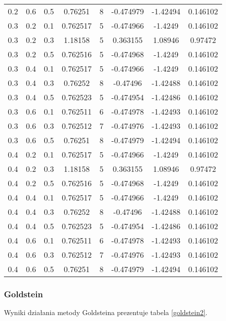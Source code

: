 \documentclass{classrep}
\begin{document}
\begin{table}
\begin{tabular}{|c|c|c|c|c|c|c|c|}
    0.2 & 0.6 & 0.5 & 0.76251 & 8 & -0.474979 & -1.42494 & 0.146102 \\
    0.3 & 0.2 & 0.1 & 0.762517 & 5 & -0.474966 & -1.4249 & 0.146102 \\
    0.3 & 0.2 & 0.3 & 1.18158 & 5 & 0.363155 & 1.08946 & 0.97472 \\
    0.3 & 0.2 & 0.5 & 0.762516 & 5 & -0.474968 & -1.4249 & 0.146102 \\
    0.3 & 0.4 & 0.1 & 0.762517 & 5 & -0.474966 & -1.4249 & 0.146102 \\
    0.3 & 0.4 & 0.3 & 0.76252 & 8 & -0.47496 & -1.42488 & 0.146102 \\
    0.3 & 0.4 & 0.5 & 0.762523 & 5 & -0.474954 & -1.42486 & 0.146102 \\
    0.3 & 0.6 & 0.1 & 0.762511 & 6 & -0.474978 & -1.42493 & 0.146102 \\
    0.3 & 0.6 & 0.3 & 0.762512 & 7 & -0.474976 & -1.42493 & 0.146102 \\
    0.3 & 0.6 & 0.5 & 0.76251 & 8 & -0.474979 & -1.42494 & 0.146102 \\
    0.4 & 0.2 & 0.1 & 0.762517 & 5 & -0.474966 & -1.4249 & 0.146102 \\
    0.4 & 0.2 & 0.3 & 1.18158 & 5 & 0.363155 & 1.08946 & 0.97472 \\
    0.4 & 0.2 & 0.5 & 0.762516 & 5 & -0.474968 & -1.4249 & 0.146102 \\
    0.4 & 0.4 & 0.1 & 0.762517 & 5 & -0.474966 & -1.4249 & 0.146102 \\
    0.4 & 0.4 & 0.3 & 0.76252 & 8 & -0.47496 & -1.42488 & 0.146102 \\
    0.4 & 0.4 & 0.5 & 0.762523 & 5 & -0.474954 & -1.42486 & 0.146102 \\
    0.4 & 0.6 & 0.1 & 0.762511 & 6 & -0.474978 & -1.42493 & 0.146102 \\
    0.4 & 0.6 & 0.3 & 0.762512 & 7 & -0.474976 & -1.42493 & 0.146102 \\
    0.4 & 0.6 & 0.5 & 0.76251 & 8 & -0.474979 & -1.42494 & 0.146102 \\
    \hline
  \end{tabular}
\end{table}

\subsubsection{Goldstein}

Wyniki działania metody Goldsteina prezentuje tabela \ref{goldstein2}.
\end{document}
